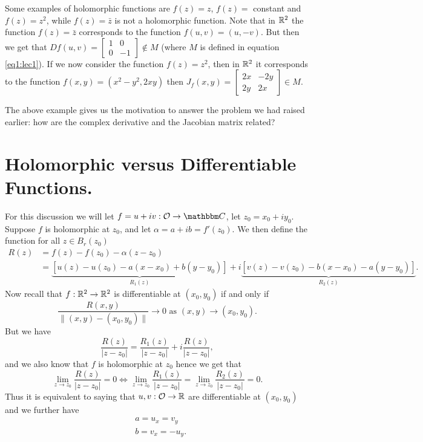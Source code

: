 \documentclass[../ComplexAnalysis_Notes.tex]{subfiles}
\begin{document}
\begin{Eg}{}{}
    Some examples of holomorphic functions are $f(z) = z$, $f(z) = $ constant and $f(z) = z^2$, while $f(z) = \bar{z}$ is not a holomorphic function. Note that in $\mathbb{R}^2$ the function $f(z) = \bar{z}$ corresponds to the function $f(u,v) = (u,-v)$. But then we get that $Df(u,v) = \begin{bmatrix}
        1 & 0 \\ 0 & -1
    \end{bmatrix} \notin M$ (where $M$ is defined in equation \ref{eq1:lec1}). If we now consider the function $f(z) = z^2$, then in $\mathbb{R}^2$ it corresponds to the function $f(x,y) = (x^2 - y^2, 2xy)$ then $J_f(x,y) = \begin{bmatrix}
        2x & -2y \\ 2y & 2x
    \end{bmatrix} \in M$.   
\end{Eg}

The above example gives us the motivation to answer the problem we had raised earlier: how are the complex derivative and the Jacobian matrix related? 

\section{Holomorphic versus Differentiable Functions.}

For this discussion we will let $f = u + iv : \mathcal{O} \to \C$, let $z_0 = x_0 + i y_0$. Suppose $f$ is holomorphic at $z_0$, and let $\alpha = a + i b = f'(z_0)$. We then define the function for all $z \in B_r(z_0)$
\begin{align*}
    R(z) &= f(z) - f(z_0) - \alpha (z-z_0) \\ 
         &= \underbrace{[u(z) - u(z_0) - a(x-x_0) + b(y-y_0)]}_{R_1(z)} + i \underbrace{[v(z) - v(z_0) - b(x-x_0) - a(y - y_0)]}_{R_2(z)}. 
\end{align*}
Now recall that $f : \mathbb{R}^2 \to \mathbb{R}^2$ is differentiable at $(x_0,y_0)$ if and only if 
\[
    \frac{R(x,y)}{\| (x,y) - (x_0,y_0) \|} \to 0 \mbox{ as } (x,y) \to (x_0,y_0).
\]
But we have 
\[
    \frac{R(z)}{|z-z_0|} = \frac{R_1(z)}{|z-z_0|} + i \frac{R(z)}{|z-z_0|},
\]
and we also know that $f$ is holomorphic at $z_0$ hence we get that 
\[
    \lim_{z \to z_0} \frac{R(z)}{|z-z_0|} = 0 \Leftrightarrow \lim_{z \to z_0} \frac{R_1(z)}{|z-z_0|} = \lim_{z \to z_0} \frac{R_2(z)}{|z-z_0|} = 0.     
\]
Thus it is equivalent to saying that $u,v : \mathcal{O} \to \mathbb{R}$ are differentiable at $(x_0,y_0)$ and we further have 
\begin{align*}
    & a = u_x = v_y \\ 
    & b = v_x = - u_y.
\end{align*}
\end{document}
